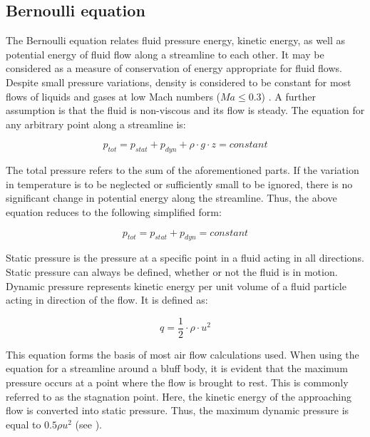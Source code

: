 \subsection{Bernoulli equation}

The Bernoulli equation relates fluid pressure energy, kinetic energy, as well as potential energy of fluid flow along a streamline to each other. It may be considered as a measure of conservation of energy appropriate for fluid flows. Despite small pressure variations, density is considered to be constant for most flows of liquids and gases at low Mach numbers ($Ma \leq \num{0.3}$) \citep{fischer2008experimentelle, Hucho2011}. A further assumption is that the fluid is non-viscous and its flow is steady. The equation for any arbitrary point along a streamline is:

\begin{equation}
p_{tot} = p_{stat} + p_{dyn} + \rho \cdot g \cdot z = constant
\end{equation}

The total pressure refers to the sum of the aforementioned parts. If the variation in temperature is to be neglected or sufficiently small to be ignored, there is no significant change in potential energy along the streamline. Thus,  the above equation reduces to the following simplified form:

\begin{equation}
p_{tot} = p_{stat} + p_{dyn} = constant
\end{equation}

Static pressure is the pressure at a specific point in a fluid acting in all directions. Static pressure can always
be defined, whether or not the fluid is in motion.
Dynamic pressure represents kinetic energy per unit volume of a fluid particle acting in direction of the flow. It is defined as:

\begin{equation}
q = \frac{1}{2} \cdot \rho \cdot u^2
\end{equation}


This equation forms the basis of most air flow calculations used. When using the equation for a streamline around a bluff body, it is evident that the maximum pressure occurs at a point where the flow is brought to rest. This is commonly referred to as the stagnation point. Here, the kinetic energy of the approaching flow is converted into static pressure. Thus, the maximum dynamic pressure is equal to $0.5 \rho u^2$ (see ).



